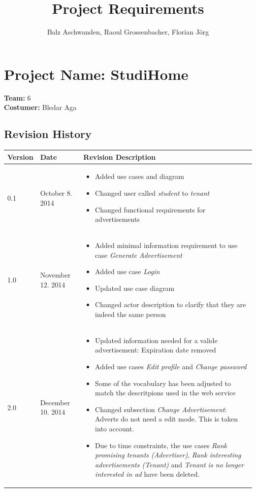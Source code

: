 \documentclass[a4paper,11pt]{article}
\title{Project Requirements}
\author{Balz Aschwanden, Raoul Grossenbacher, Florian Jörg}
\begin{document}
\maketitle
\section*{Project Name: StudiHome}

\textbf{Team:} 6 \\
\textbf{Costumer:} Bledar Aga \\

\subsection*{Revision History}
\begin{tabular}{|p{1.2cm}|p{3cm}|p{8cm}|} \hline
  Version & Date & Revision Description \\ \hline
  0.1 & October 8. 2014 &
  \begin{itemize}
  	\item Added use cases and diagram
  	\item Changed user called \textit{student} to \textit{tenant}
  	\item Changed functional requirements for advertisements
  \end{itemize} \\ \hline
  1.0 & November 12. 2014 & 
  \begin{itemize}
  	\item Added minimal information requirement to use case \textit{Generate Advertisement}
  	\item Added use case \textit{Login}
  	\item Updated use case diagram
  	\item Changed actor description to clarify that they are indeed the same person
  \end{itemize} \\ \hline
  2.0 & December 10. 2014 & 
  \begin{itemize}
    \item Updated information needed for a valide advertisement: Expiration date removed
    \item Added use cases \textit{Edit profile} and \textit{Change password}
    \item Some of the vocabulary has been adjusted to match the descritpions used in the web service
    \item Changed subsection \textit{Change Advertisement}: Adverts do not need a edit mode. This is taken into account.
    \item Due to time constraints, the use cases \textit{Rank promising tenants (Advertiser)}, \textit{Rank interesting advertisements (Tenant)} and \textit{Tenant is no longer interested in ad} have been deleted.
  \end{itemize}\\ \hline

\end{tabular}
\end{document}
